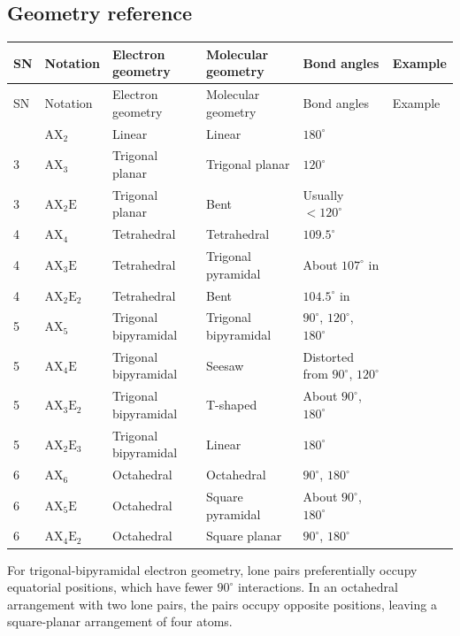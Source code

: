 \documentclass[a4paper,10pt]{article}
\begin{document}
\subsection{Geometry reference}
\begin{longtable}{@{}P{9mm}P{18mm}P{35mm}P{35mm}P{30mm}P{20mm}@{}}
\toprule
SN & Notation & Electron geometry & Molecular geometry & Bond angles & Example \\
\midrule
\endfirsthead
\toprule
SN & Notation & Electron geometry & Molecular geometry & Bond angles & Example \\
\midrule
\endhead
\bottomrule
{} & $\mathrm{AX}_2$ & Linear & Linear & $180^\circ$ &  \\
3 & $\mathrm{AX}_3$ & Trigonal planar & Trigonal planar & $120^\circ$ &  \\
3 & $\mathrm{AX}_2\mathrm E$ & Trigonal planar & Bent & Usually $<120^\circ$ &  \\
4 & $\mathrm{AX}_4$ & Tetrahedral & Tetrahedral & $109.5^\circ$ &  \\
4 & $\mathrm{AX}_3\mathrm E$ & Tetrahedral & Trigonal pyramidal & About $107^\circ$ in  &  \\
4 & $\mathrm{AX}_2\mathrm E_2$ & Tetrahedral & Bent & $104.5^\circ$ in  &  \\
5 & $\mathrm{AX}_5$ & Trigonal bipyramidal & Trigonal bipyramidal & $90^\circ$, $120^\circ$, $180^\circ$ &  \\
5 & $\mathrm{AX}_4\mathrm E$ & Trigonal bipyramidal & Seesaw & Distorted from $90^\circ$, $120^\circ$ &  \\
5 & $\mathrm{AX}_3\mathrm E_2$ & Trigonal bipyramidal & T-shaped & About $90^\circ$, $180^\circ$ &  \\
5 & $\mathrm{AX}_2\mathrm E_3$ & Trigonal bipyramidal & Linear & $180^\circ$ &  \\
6 & $\mathrm{AX}_6$ & Octahedral & Octahedral & $90^\circ$, $180^\circ$ &  \\
6 & $\mathrm{AX}_5\mathrm E$ & Octahedral & Square pyramidal & About $90^\circ$, $180^\circ$ &  \\
6 & $\mathrm{AX}_4\mathrm E_2$ & Octahedral & Square planar & $90^\circ$, $180^\circ$ &  \\
\end{longtable}
For trigonal-bipyramidal electron geometry, lone pairs preferentially occupy
equatorial positions, which have fewer $90^\circ$ interactions. In an octahedral
arrangement with two lone pairs, the pairs occupy opposite positions, leaving
a square-planar arrangement of four atoms.
\end{document}
